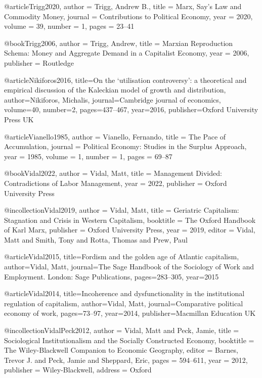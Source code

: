 @article{Trigg2020,
	author  = {Trigg, Andrew B.},
	title   = {Marx, Say's Law and Commodity Money},
	journal = {Contributions to Political Economy},
	year    = {2020},
	volume  = {39},
	number  = {1},
	pages   = {23--41}
}

@book{Trigg2006,
	author    = {Trigg, Andrew},
	title     = {Marxian Reproduction Schema: Money and Aggregate Demand in a Capitalist Economy},
	year      = {2006},
	publisher = {Routledge}
}

@article{Nikiforos2016,
	title={On the ‘utilisation controversy’: a theoretical and empirical discussion of the Kaleckian model of growth and distribution},
	author={Nikiforos, Michalis},
	journal={Cambridge journal of economics},
	volume={40},
	number={2},
	pages={437--467},
	year={2016},
	publisher={Oxford University Press UK}
}


@article{Vianello1985,
	author  = {Vianello, Fernando},
	title   = {The Pace of Accumulation},
	journal = {Political Economy: Studies in the Surplus Approach},
	year    = {1985},
	volume  = {1},
	number  = {1},
	pages   = {69--87}
}

@book{Vidal2022,
	author    = {Vidal, Matt},
	title     = {Management Divided: Contradictions of Labor Management},
	year      = {2022},
	publisher = {Oxford University Press}
}

@incollection{Vidal2019,
	author    = {Vidal, Matt},
	title     = {Geriatric Capitalism: Stagnation and Crisis in Western Capitalism},
	booktitle = {The Oxford Handbook of Karl Marx},
	publisher = {Oxford University Press},
	year      = {2019},
	editor    = {Vidal, Matt and Smith, Tony and Rotta, Thomas and Prew, Paul}
}

@article{Vidal2015,
	title={Fordism and the golden age of Atlantic capitalism},
	author={Vidal, Matt},
	journal={The Sage Handbook of the Sociology of Work and Employment. London: Sage Publications},
	pages={283--305},
	year={2015}
}

@article{Vidal2014,
	title={Incoherence and dysfunctionality in the institutional regulation of capitalism},
	author={Vidal, Matt},
	journal={Comparative political economy of work},
	pages={73--97},
	year={2014},
	publisher={Macmillan Education UK}
}

@incollection{VidalPeck2012,
	author    = {Vidal, Matt and Peck, Jamie},
	title     = {Sociological Institutionalism and the Socially Constructed Economy},
	booktitle = {The Wiley-Blackwell Companion to Economic Geography},
	editor    = {Barnes, Trevor J. and Peck, Jamie and Sheppard, Eric},
	pages     = {594--611},
	year      = {2012},
	publisher = {Wiley-Blackwell},
	address   = {Oxford}
}

